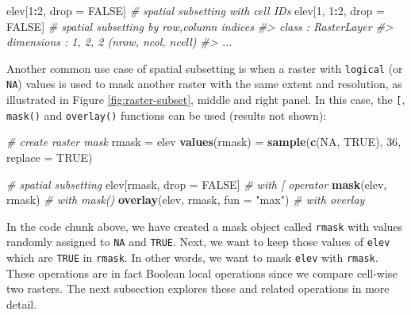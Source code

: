 \documentclass[]{krantz}
\newenvironment{Shaded}{\begin{snugshade}}{\end{snugshade}}
\newcommand{\CommentTok}[1]{\textcolor[rgb]{0.37,0.37,0.37}{\textit{#1}}}
\newcommand{\DataTypeTok}[1]{\textcolor[rgb]{0.27,0.27,0.27}{#1}}
\newcommand{\DecValTok}[1]{\textcolor[rgb]{0.06,0.06,0.06}{#1}}
\newcommand{\KeywordTok}[1]{\textcolor[rgb]{0.27,0.27,0.27}{\textbf{#1}}}
\newcommand{\NormalTok}[1]{#1}
\newcommand{\OperatorTok}[1]{\textcolor[rgb]{0.43,0.43,0.43}{\textbf{#1}}}
\newcommand{\OtherTok}[1]{\textcolor[rgb]{0.37,0.37,0.37}{#1}}
\newcommand{\StringTok}[1]{\textcolor[rgb]{0.5,0.5,0.5}{#1}}
\begin{document}
\begin{Shaded}
\begin{Highlighting}[]
\NormalTok{elev[}\DecValTok{1}\OperatorTok{:}\DecValTok{2}\NormalTok{, drop =}\StringTok{ }\OtherTok{FALSE}\NormalTok{]    }\CommentTok{# spatial subsetting with cell IDs}
\NormalTok{elev[}\DecValTok{1}\NormalTok{, }\DecValTok{1}\OperatorTok{:}\DecValTok{2}\NormalTok{, drop =}\StringTok{ }\OtherTok{FALSE}\NormalTok{] }\CommentTok{# spatial subsetting by row,column indices}
\CommentTok{#> class       : RasterLayer }
\CommentTok{#> dimensions  : 1, 2, 2  (nrow, ncol, ncell)}
\CommentTok{#> ...}
\end{Highlighting}
\end{Shaded}

Another common use case of spatial subsetting is when a raster with \texttt{logical} (or \texttt{NA}) values is used to mask another raster with the same extent and resolution, as illustrated in Figure \ref{fig:raster-subset}, middle and right panel.
In this case, the \texttt{{[}}, \texttt{mask()} and \texttt{overlay()} functions can be used (results not shown):

\begin{Shaded}
\begin{Highlighting}[]
\CommentTok{# create raster mask}
\NormalTok{rmask =}\StringTok{ }\NormalTok{elev }
\KeywordTok{values}\NormalTok{(rmask) =}\StringTok{ }\KeywordTok{sample}\NormalTok{(}\KeywordTok{c}\NormalTok{(}\OtherTok{NA}\NormalTok{, }\OtherTok{TRUE}\NormalTok{), }\DecValTok{36}\NormalTok{, }\DataTypeTok{replace =} \OtherTok{TRUE}\NormalTok{)}

\CommentTok{# spatial subsetting}
\NormalTok{elev[rmask, drop =}\StringTok{ }\OtherTok{FALSE}\NormalTok{]           }\CommentTok{# with [ operator}
\KeywordTok{mask}\NormalTok{(elev, rmask)                   }\CommentTok{# with mask()}
\KeywordTok{overlay}\NormalTok{(elev, rmask, }\DataTypeTok{fun =} \StringTok{"max"}\NormalTok{)   }\CommentTok{# with overlay}
\end{Highlighting}
\end{Shaded}

In the code chunk above, we have created a mask object called \texttt{rmask} with values randomly assigned to \texttt{NA} and \texttt{TRUE}.
Next, we want to keep those values of \texttt{elev} which are \texttt{TRUE} in \texttt{rmask}.
In other words, we want to mask \texttt{elev} with \texttt{rmask}.
These operations are in fact Boolean local operations since we compare cell-wise two rasters.
The next subsection explores these and related operations in more detail.
\end{document}
